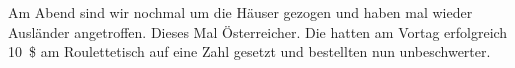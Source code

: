 \thispagestyle{empty}

\vspace*{.4\paperheight}

Am Abend sind wir nochmal um die Häuser gezogen und haben mal wieder Ausländer angetroffen.
Dieses Mal Österreicher.
Die hatten am Vortag erfolgreich 10~\$ am Roulettetisch auf eine Zahl gesetzt und bestellten nun unbeschwerter.
